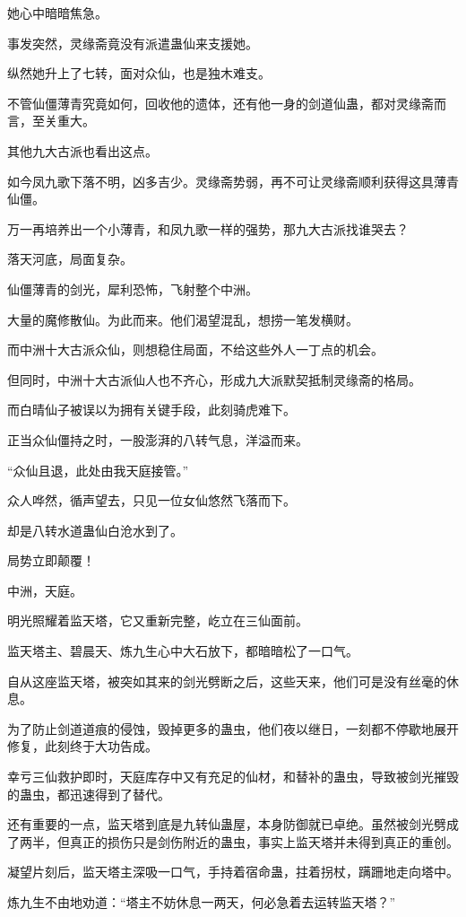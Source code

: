 \begin{this_body}
她心中暗暗焦急。

事发突然，灵缘斋竟没有派遣蛊仙来支援她。

纵然她升上了七转，面对众仙，也是独木难支。

不管仙僵薄青究竟如何，回收他的遗体，还有他一身的剑道仙蛊，都对灵缘斋而言，至关重大。

其他九大古派也看出这点。

如今凤九歌下落不明，凶多吉少。灵缘斋势弱，再不可让灵缘斋顺利获得这具薄青仙僵。

万一再培养出一个小薄青，和凤九歌一样的强势，那九大古派找谁哭去？

落天河底，局面复杂。

仙僵薄青的剑光，犀利恐怖，飞射整个中洲。

大量的魔修散仙。为此而来。他们渴望混乱，想捞一笔发横财。

而中洲十大古派众仙，则想稳住局面，不给这些外人一丁点的机会。

但同时，中洲十大古派仙人也不齐心，形成九大派默契抵制灵缘斋的格局。

而白晴仙子被误以为拥有关键手段，此刻骑虎难下。

正当众仙僵持之时，一股澎湃的八转气息，洋溢而来。

“众仙且退，此处由我天庭接管。”

众人哗然，循声望去，只见一位女仙悠然飞落而下。

却是八转水道蛊仙白沧水到了。

局势立即颠覆！

中洲，天庭。

明光照耀着监天塔，它又重新完整，屹立在三仙面前。

监天塔主、碧晨天、炼九生心中大石放下，都暗暗松了一口气。

自从这座监天塔，被突如其来的剑光劈断之后，这些天来，他们可是没有丝毫的休息。

为了防止剑道道痕的侵蚀，毁掉更多的蛊虫，他们夜以继日，一刻都不停歇地展开修复，此刻终于大功告成。

幸亏三仙救护即时，天庭库存中又有充足的仙材，和替补的蛊虫，导致被剑光摧毁的蛊虫，都迅速得到了替代。

还有重要的一点，监天塔到底是九转仙蛊屋，本身防御就已卓绝。虽然被剑光劈成了两半，但真正的损伤只是剑伤附近的蛊虫，事实上监天塔并未得到真正的重创。

凝望片刻后，监天塔主深吸一口气，手持着宿命蛊，拄着拐杖，蹒跚地走向塔中。

炼九生不由地劝道：“塔主不妨休息一两天，何必急着去运转监天塔？”


\end{this_body}
